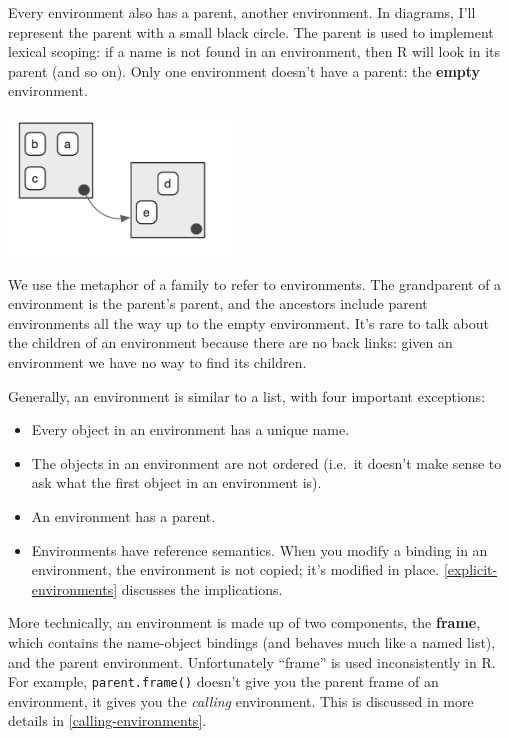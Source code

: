 \documentclass[oneside]{book}
\renewcommand{\hyperref}[2][???]{\autoref{#1}}
\begin{document}
Every environment also has a parent, another environment. In diagrams,
I'll represent the parent with a small black circle. The parent is used
to implement lexical scoping: if a name is not found in an environment,
then R will look in its parent (and so on). Only one environment doesn't
have a parent: the \textbf{empty} environment.

\includegraphics[width=2.36in,height=1.47in]{diagrams/environments.png/parents.png}

We use the metaphor of a family to refer to environments. The
grandparent of a environment is the parent's parent, and the ancestors
include parent environments all the way up to the empty environment.
It's rare to talk about the children of an environment because there are
no back links: given an environment we have no way to find its children.

Generally, an environment is similar to a list, with four important
exceptions:

\begin{itemize}
\item
  Every object in an environment has a unique name.
\item
  The objects in an environment are not ordered (i.e.~it doesn't make
  sense to ask what the first object in an environment is).
\item
  An environment has a parent.
\item
  Environments have reference semantics. When you modify a binding in an
  environment, the environment is not copied; it's modified in place.
  \hyperref[explicit-environments]{Explicit environments} discusses the
  implications.
\end{itemize}

More technically, an environment is made up of two components, the
\textbf{frame}, which contains the name-object bindings (and behaves
much like a named list), and the parent environment. Unfortunately
``frame'' is used inconsistently in R. For example,
\texttt{parent.frame()} doesn't give you the parent frame of an
environment, it gives you the \emph{calling} environment. This is
discussed in more details in \hyperref[calling-environments]{calling
environments}.
\end{document}
